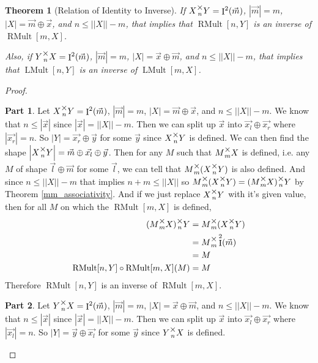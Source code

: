 \documentclass[12pt]{book}
\theoremstyle{plain}
\newtheorem{theorem}{Theorem}[chapter]
\theoremstyle{definition}
\theoremstyle{ppart}
\newtheorem{ppart}{Part}
\theoremstyle{case}
\theoremstyle{solution}
\DeclareMathOperator{\Ident}{I}
\DeclareMathOperator{\RMult}{RMult}
\DeclareMathOperator{\LMult}{LMult}
\newcommand{\mmult}[1]{\text{\raisebox{1ex}{$\underset{#1}{\times}$}}}
\newcommand{\shape}[1]{\left|#1\right|}
\begin{document}
\begin{theorem}[Relation of Identity to Inverse]
If $X \mmult{n} Y = \Ident^2(\vec{m})$, $\shape{\vec{m}} = m$, $\shape{X} = \vec{m} \oplus \vec{x}$,
and $n \le \shape{\shape{X}}-m$, that implies that $\RMult[n, Y]$ is an inverse of $\RMult[m, X]$.

Also,  if $Y \mmult{n} X = \Ident^2(\vec{m})$, $\shape{\vec{m}} = m$, $\shape{X} = \vec{x} \oplus \vec{m}$,
and $n \le \shape{\shape{X}}-m$, that implies that $\LMult[n, Y]$ is an inverse of $\LMult[m, X]$.
\end{theorem}
\begin{proof}
\begin{ppart}
Let $X \mmult{n} Y = \Ident^2(\vec{m})$, $\shape{\vec{m}} = m$, $\shape{X} = \vec{m} \oplus \vec{x}$, and $n \le \shape{\shape{X}}-m$.
We know that $n \le \shape{\vec{x}}$ since $\shape{\vec{x}} = \shape{\shape{X}}-m$.
Then we can split up $\vec{x}$ into $\vec{x_l} \oplus \vec{x_r}$ where $\shape{\vec{x_r}} = n$.
So $\shape{Y} = \vec{x_r} \oplus \vec{y}$ for some $\vec{y}$ since $X \mmult{n} Y$ is defined.
We can then find the shape $\shape{X \mmult{n} Y} = \vec{m} \oplus \vec{x_l} \oplus \vec{y}$.
Then for any $M$ such that $M \mmult{m} X$ is defined, i.e. any $M$ of shape $\vec{l} \oplus \vec{m}$ for some $\vec{l}$,
we can tell that $M \mmult{m} (X \mmult{n} Y)$ is also defined.
And since $n \le \shape{\shape{X}}-m$ that implies $n+m \le \shape{\shape{X}}$ so $M \mmult{m} (X \mmult{n} Y) = (M \mmult{m} X) \mmult{n} Y$
by Theorem \ref{mm_associativity}.
And if we just replace $X \mmult{n} Y$ with it's given value, then for all $M$ on which the $\RMult[m,X]$ is defined,
\begin{align*}
  (M \mmult{m} X) \mmult{n} Y &= M \mmult{m} (X \mmult{n} Y)  \\
  &= M \mmult{m} \Ident^2(\vec{m}) \\
  &= M \\
  \RMult[n,Y] \circ \RMult[m,X](M) &= M
\end{align*}
Therefore $\RMult[n,Y]$ is an inverse of $\RMult[m,X]$.
\end{ppart}
\begin{ppart}
Let $Y \mmult{n} X = \Ident^2(\vec{m})$, $\shape{\vec{m}} = m$, $\shape{X} = \vec{x} \oplus \vec{m}$, and $n \le \shape{\shape{X}}-m$.
We know that $n \le \shape{\vec{x}}$ since $\shape{\vec{x}} = \shape{\shape{X}}-m$.
Then we can split up $\vec{x}$ into $\vec{x_l} \oplus \vec{x_r}$ where $\shape{\vec{x_l}} = n$.
So $\shape{Y} = \vec{y} \oplus \vec{x_l}$ for some $\vec{y}$ since $Y \mmult{n} X$ is defined.

\end{ppart}
\end{proof}
\end{document}
